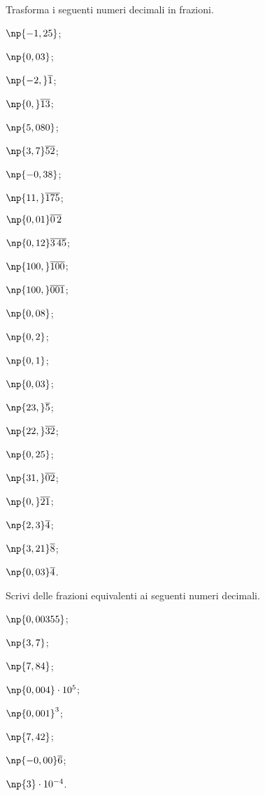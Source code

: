 \begin{esercizio}[\Ast]
\label{ese:3.28}
 Trasforma i seguenti numeri decimali in frazioni.
\begin{multicols}{4}
\begin{enumeratea}
\item $\np{-1,25}$;
\item $\np{0,03}$;
\item $\np{-2,}\overline{1}$;
\item $\np{0,}\overline{13}$;
\item $\np{5,080}$;
\item $\np{3,7}\overline{52}$;
\item $\np{-0,38}$;
\item $\np{11,}\overline{175}$;
\item $\np{0,01}\overline{0\,2}$
\item $\np{0,12}\overline{3\,45}$;
\item $\np{100,}\overline{100}$;
\item $\np{100,}\overline{001}$;
\item $\np{0,08}$;
\item $\np{0,2}$;
\item $\np{0,1}$;
\item $\np{0,03}$;
\item $\np{23,}\overline{5}$;
\item $\np{22,}\overline{32}$;
\item $\np{0,25}$;
\item $\np{31,}\overline{02}$;
\item $\np{0,}\overline{21}$;
\item $\np{2,3}\overline{4}$;
\item $\np{3,21}\overline{8}$;
\item $\np{0,03}\overline{4}$.
\end{enumeratea}
\end{multicols}
\end{esercizio}
\pagebreak
\begin{esercizio}
\label{ese:3.29}
 Scrivi delle frazioni equivalenti ai seguenti numeri decimali.
\begin{multicols}{4}
\begin{enumeratea}
\item $\np{0,00355}$;
\item $\np{3,7}$;
\item $\np{7,84}$;
\item $\np{0,004}\cdot 10^{5}$;
\item $\np{0,001}^{3}$;
\item $\np{7,42}$;
\item $\np{-0,00}\overline{6}$;
\item $\np{3}\cdot 10^{-4}$.
\end{enumeratea}
\end{multicols}
\end{esercizio}

